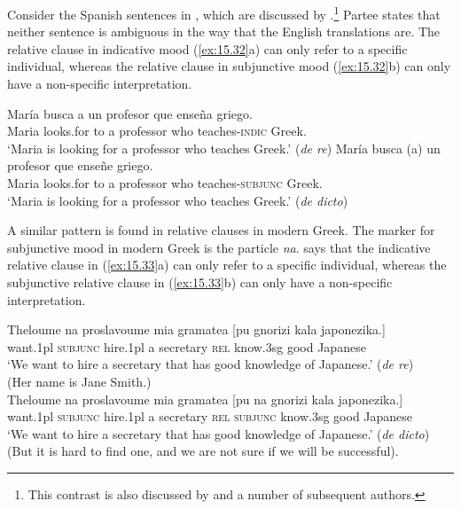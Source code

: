 Consider the Spanish sentences in , which are discussed by \citet{Partee2008}.\footnote{This contrast is also discussed by \citet{Quine1956} and a number of subsequent authors.} Partee states that neither sentence is ambiguous in the way that the English translations are. The relative clause in indicative mood (\ref{ex:15.32}a) can only refer to a specific individual, whereas the relative clause in subjunctive mood (\ref{ex:15.32}b) can only have a non-specific interpretation.


\ea \label{ex:15.32}
\ea \label{ex:15.} \gll María  busca  a  un  profesor  que  enseña  griego.\\
Maria  looks.for  to  a  professor  who  teaches-\textsc{indic}  Greek.\\
\glt ‘Maria is looking for a professor who teaches Greek.’  (\textit{de re})
\ex \gll María  busca  (a)  un  profesor  que  enseñe  griego.\\
Maria  looks.for  to  a  professor  who  teaches-\textsc{subjunc}  Greek.\\
\glt ‘Maria is looking for a professor who teaches Greek.’  (\textit{de dicto})
\z \z


A similar pattern is found in relative clauses in modern Greek. The marker for subjunctive mood in modern Greek is the particle \textit{na}. \citet{Giannakidou2011} says that the indicative relative clause in (\ref{ex:15.33}a) can only refer to a specific individual, whereas the subjunctive relative clause in (\ref{ex:15.33}b) can only have a non-specific interpretation.


\ea \label{ex:15.33}
\ea \label{ex:15.} \gll Theloume  na  proslavoume  mia  gramatea  [pu  gnorizi  kala  japonezika.]\\
want.1pl  \textsc{subjunc}  hire.1pl  a  secretary  \textsc{rel}  know.3sg  good  Japanese\\
\glt ‘We want to hire a secretary that has good knowledge of Japanese.’  (\textit{de re})\\
(Her name is Jane Smith.)\\
\ex \gll  Theloume  na  proslavoume  mia  gramatea [pu  na  gnorizi  kala  japonezika.]\\
want.1pl  \textsc{subjunc}  hire.1pl  a  secretary \textsc{rel}  \textsc{subjunc}  know.3sg  good  Japanese\\
\glt ‘We want to hire a secretary that has good knowledge of Japanese.’  (\textit{de dicto})\\
(But it is hard to find one, and we are not sure if we will be successful).\\
\z \z


